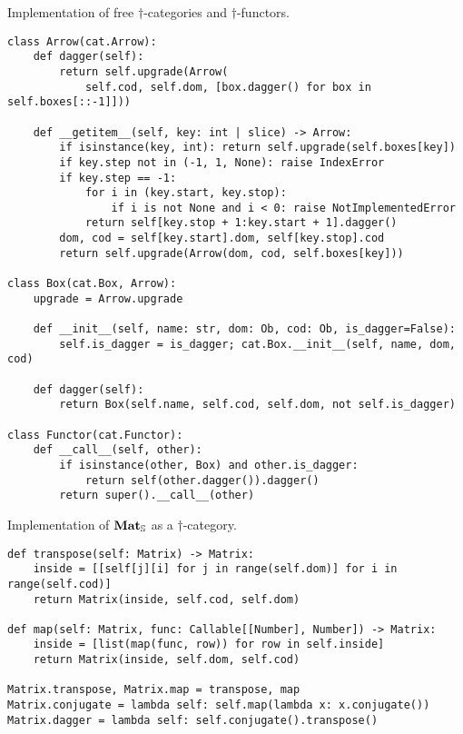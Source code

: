 \begin{python}
{\normalfont Implementation of free $\dagger$-categories and $\dagger$-functors.}
\begin{verbatim}
class Arrow(cat.Arrow):
    def dagger(self):
        return self.upgrade(Arrow(
            self.cod, self.dom, [box.dagger() for box in self.boxes[::-1]]))

    def __getitem__(self, key: int | slice) -> Arrow:
        if isinstance(key, int): return self.upgrade(self.boxes[key])
        if key.step not in (-1, 1, None): raise IndexError
        if key.step == -1:
            for i in (key.start, key.stop):
                if i is not None and i < 0: raise NotImplementedError
            return self[key.stop + 1:key.start + 1].dagger()
        dom, cod = self[key.start].dom, self[key.stop].cod
        return self.upgrade(Arrow(dom, cod, self.boxes[key]))

class Box(cat.Box, Arrow):
    upgrade = Arrow.upgrade

    def __init__(self, name: str, dom: Ob, cod: Ob, is_dagger=False):
        self.is_dagger = is_dagger; cat.Box.__init__(self, name, dom, cod)

    def dagger(self):
        return Box(self.name, self.cod, self.dom, not self.is_dagger)

class Functor(cat.Functor):
    def __call__(self, other):
        if isinstance(other, Box) and other.is_dagger:
            return self(other.dagger()).dagger()
        return super().__call__(other)
\end{verbatim}
\end{python}

\begin{python}
{\normalfont Implementation of $\mathbf{Mat}_\S$ as a $\dagger$-category.}

\begin{verbatim}
def transpose(self: Matrix) -> Matrix:
    inside = [[self[j][i] for j in range(self.dom)] for i in range(self.cod)]
    return Matrix(inside, self.cod, self.dom)

def map(self: Matrix, func: Callable[[Number], Number]) -> Matrix:
    inside = [list(map(func, row)) for row in self.inside]
    return Matrix(inside, self.dom, self.cod)

Matrix.transpose, Matrix.map = transpose, map
Matrix.conjugate = lambda self: self.map(lambda x: x.conjugate())
Matrix.dagger = lambda self: self.conjugate().transpose()
\end{verbatim}
\end{python}

